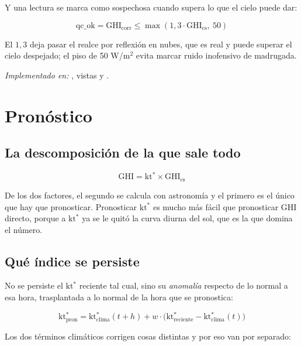 \documentclass[11pt,a4paper]{article}
\begin{document}
Y una lectura se marca como sospechosa cuando supera lo que el cielo puede dar:

\begin{equation*}
  \mathrm{qc\_ok} = \mathrm{GHI_{corr}} \leq \max\left(1{,}3 \cdot \mathrm{GHI_{cs}},\ 50\right)
\end{equation*}

El $1{,}3$ deja pasar el realce por reflexión en nubes, que es real y puede superar el
cielo despejado; el piso de 50 W/m$^2$ evita marcar ruido inofensivo de madrugada.

\emph{Implementado en:} , vistas  y
.

\section{Pronóstico}

\subsection{La descomposición de la que sale todo}

\begin{equation*}
  \mathrm{GHI} = \mathrm{kt^*} \times \mathrm{GHI_{cs}}
\end{equation*}

De los dos factores, el segundo se calcula con astronomía y el primero es el único que
hay que pronosticar. Pronosticar $\mathrm{kt^*}$ es mucho más fácil que pronosticar
$\mathrm{GHI}$ directo, porque a $\mathrm{kt^*}$ ya se le quitó la curva diurna del sol,
que es la que domina el número.

\subsection{Qué índice se persiste}

No se persiste el $\mathrm{kt^*}$ reciente tal cual, sino su \emph{anomalía} respecto de
lo normal a esa hora, trasplantada a lo normal de la hora que se pronostica:

\begin{equation*}
  \mathrm{kt^*_{pron}} = \mathrm{kt^*_{clima}}(t+h)
  + w \cdot \Big( \mathrm{kt^*_{reciente}} - \mathrm{kt^*_{clima}}(t) \Big)
\end{equation*}

Los dos términos climáticos corrigen cosas distintas y por eso van por separado:
\end{document}
